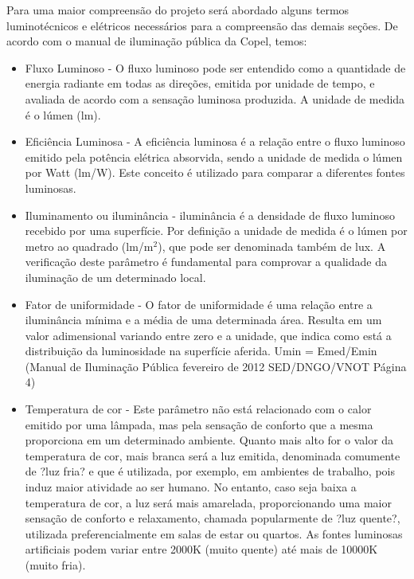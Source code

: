Para uma maior compreens\~ao do projeto ser\'a abordado alguns termos luminot\'ecnicos e el\'etricos necess\'arios para a compreens\~ao das demais se\c{c}\~oes. De acordo com o manual de ilumina\c{c}\~ao p\'ublica da Copel, temos:

 \begin{itemize}
        \item Fluxo Luminoso - O fluxo luminoso pode ser entendido como a quantidade de energia radiante em todas as dire\c{c}\~oes, emitida por unidade de tempo, e avaliada de acordo com a sensa\c{c}\~ao luminosa produzida. A unidade de medida \'e o l\'umen (lm).
	\item Efici\^encia Luminosa - A efici\^encia luminosa \'e a rela\c{c}\~ao entre o fluxo luminoso emitido pela pot\^encia el\'etrica absorvida, sendo a unidade de medida o l\'umen por Watt (lm/W). Este conceito \'e utilizado para comparar a diferentes fontes luminosas.
	\item Iluminamento ou ilumin\^ancia - ilumin\^ancia \'e a densidade de fluxo luminoso recebido por uma superf\'icie. Por defini\c{c}\~ao a unidade de medida \'e o l\'umen por metro ao quadrado (lm/m$^{2}$), que pode ser denominada tamb\'em de lux. A verifica\c{c}\~ao deste par\^ametro \'e fundamental para comprovar a qualidade da ilumina\c{c}\~ao de um determinado local.
	\item Fator de uniformidade - O fator de uniformidade \'e uma rela\c{c}\~ao entre a ilumin\^ancia m\'inima e a m\'edia de uma determinada \'area. Resulta em um valor adimensional variando entre zero e a unidade, que indica como est\'a a distribui\c{c}\~ao da luminosidade na superf\'icie aferida. Umin = Emed/Emin (Manual de Ilumina\c{c}\~ao P\'ublica fevereiro de 2012 SED/DNGO/VNOT P\'agina 4)
	\item Temperatura de cor - Este par\^ametro n\~ao est\'a relacionado com o calor emitido por uma l\^ampada, mas pela sensa\c{c}\~ao de conforto que a mesma proporciona em um determinado ambiente. Quanto mais alto for o valor da temperatura de cor, mais branca ser\'a a luz emitida, denominada comumente de ?luz fria? e que \'e utilizada, por exemplo, em ambientes de trabalho, pois induz maior atividade ao ser humano. No entanto, caso seja baixa a temperatura de cor, a luz ser\'a mais amarelada, proporcionando uma maior sensa\c{c}\~ao de conforto e relaxamento, chamada popularmente de ?luz quente?, utilizada preferencialmente em salas de estar ou quartos. As fontes luminosas artificiais podem variar entre 2000K (muito quente) at\'e mais de 10000K (muito fria).

\end{itemize}

